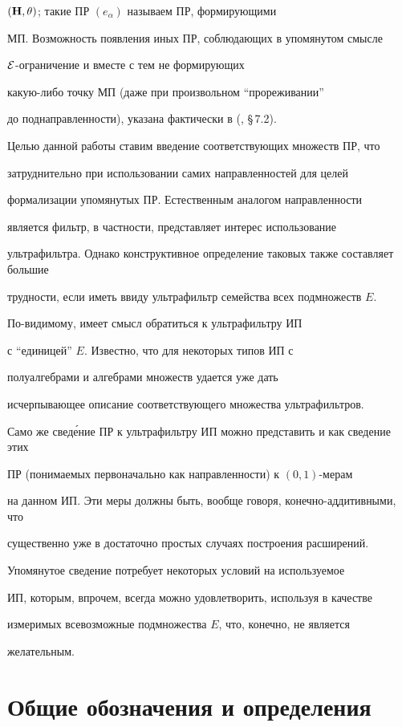 $({\bold H},\theta)$; такие ПР $(e_\alpha)$ называем ПР, формирующими


МП. Возможность появления иных ПР, соблюдающих в упомянутом смысле


${\cal E}$-ограничение и вместе с тем не формирующих


какую-либо точку МП (даже при произвольном ``прореживании''


до поднаправленности), указана фактически в (\cite{2}, \S\,7.2).


Целью данной работы ставим введение соответствующих множеств ПР, что


затруднительно при использовании самих направленностей для целей


формализации упомянутых ПР. Естественным аналогом направленности


является фильтр, в частности, представляет интерес использование


ультрафильтра. Однако конструктивное определение таковых также составляет большие


трудности, если иметь ввиду ультрафильтр семейства всех подмножеств $E$.


По-видимому, имеет смысл обратиться к ультрафильтру ИП


с ``единицей'' $E$. Известно, что для некоторых типов ИП с


полуалгебрами и алгебрами множеств удается уже дать


исчерпывающее описание соответствующего множества ультрафильтров.


Само же свед\'ение ПР к ультрафильтру ИП можно представить и как сведение этих


ПР (понимаемых первоначально как направленности) к $(0,1)$-мерам


на данном ИП. Эти меры должны быть, вообще говоря, конечно-аддитивными, что


существенно уже в достаточно простых случаях построения расширений.


Упомянутое сведение потребует некоторых условий на используемое


ИП, которым, впрочем, всегда можно удовлетворить, используя в качестве


измеримых всевозможные подмножества $E$, что, конечно, не является


желательным.








\section{Общие обозначения и определения}





